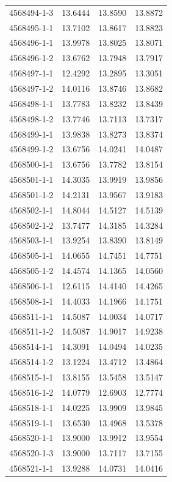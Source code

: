 \begin{longtable}{lrrr}
4568494-1-3 & 13.6444 & 13.8590 & 13.8872 \\
4568495-1-1 & 13.7102 & 13.8617 & 13.8823 \\
4568496-1-1 & 13.9978 & 13.8025 & 13.8071 \\
4568496-1-2 & 13.6762 & 13.7948 & 13.7917 \\
4568497-1-1 & 12.4292 & 13.2895 & 13.3051 \\
4568497-1-2 & 14.0116 & 13.8746 & 13.8682 \\
4568498-1-1 & 13.7783 & 13.8232 & 13.8439 \\
4568498-1-2 & 13.7746 & 13.7113 & 13.7317 \\
4568499-1-1 & 13.9838 & 13.8273 & 13.8374 \\
4568499-1-2 & 13.6756 & 14.0241 & 14.0487 \\
4568500-1-1 & 13.6756 & 13.7782 & 13.8154 \\
4568501-1-1 & 14.3035 & 13.9919 & 13.9856 \\
4568501-1-2 & 14.2131 & 13.9567 & 13.9183 \\
4568502-1-1 & 14.8044 & 14.5127 & 14.5139 \\
4568502-1-2 & 13.7477 & 14.3185 & 14.3284 \\
4568503-1-1 & 13.9254 & 13.8390 & 13.8149 \\
4568505-1-1 & 14.0655 & 14.7451 & 14.7751 \\
4568505-1-2 & 14.4574 & 14.1365 & 14.0560 \\
4568506-1-1 & 12.6115 & 14.4140 & 14.4265 \\
4568508-1-1 & 14.4033 & 14.1966 & 14.1751 \\
4568511-1-1 & 14.5087 & 14.0034 & 14.0717 \\
4568511-1-2 & 14.5087 & 14.9017 & 14.9238 \\
4568514-1-1 & 14.3091 & 14.0494 & 14.0235 \\
4568514-1-2 & 13.1224 & 13.4712 & 13.4864 \\
4568515-1-1 & 13.8155 & 13.5458 & 13.5147 \\
4568516-1-2 & 14.0779 & 12.6903 & 12.7774 \\
4568518-1-1 & 14.0225 & 13.9909 & 13.9845 \\
4568519-1-1 & 13.6530 & 13.4968 & 13.5378 \\
4568520-1-1 & 13.9000 & 13.9912 & 13.9554 \\
4568520-1-3 & 13.9000 & 13.7117 & 13.7155 \\
4568521-1-1 & 13.9288 & 14.0731 & 14.0416 \\

\end{longtable}
